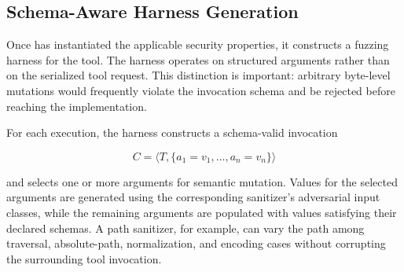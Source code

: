 


\subsection{Schema-Aware Harness Generation}
\label{sec:design-harness}

Once \project{} has instantiated the applicable security properties, it
constructs a fuzzing harness for the tool. The harness operates on structured
arguments rather than on the serialized tool request. This distinction is
important: arbitrary byte-level mutations would frequently violate the
invocation schema and be rejected before reaching the implementation.

For each execution, the harness constructs a schema-valid invocation

\[
C = \langle T,\{a_1=v_1,\ldots,a_n=v_n\}\rangle
\]

and selects one or more arguments for semantic mutation. Values for the
selected arguments are generated using the corresponding sanitizer's
adversarial input classes, while the remaining arguments are populated with
values satisfying their declared schemas. A path sanitizer, for example, can
vary the path among traversal, absolute-path, normalization, and encoding
cases without corrupting the surrounding tool invocation.

